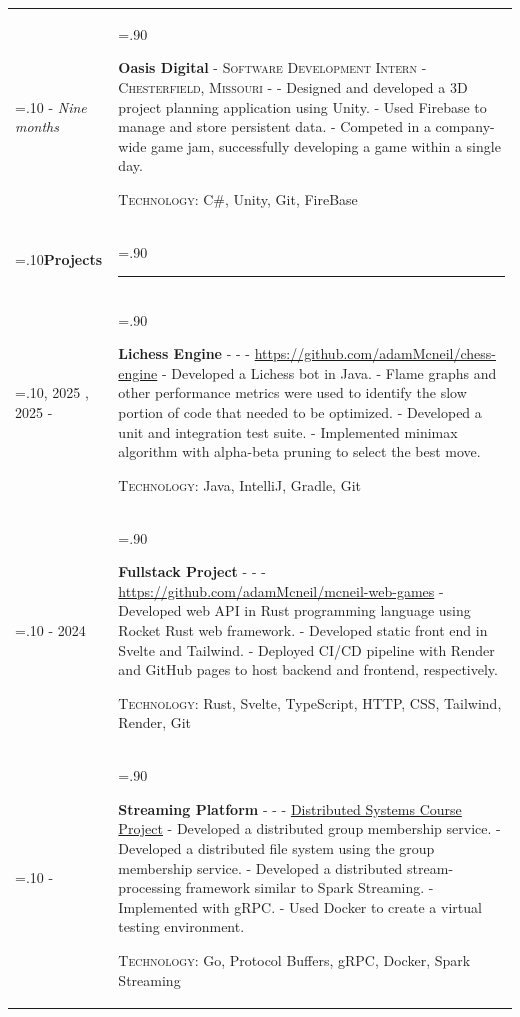 \documentclass[10pt]{article}
\newcommand{\timeFrame}[3] {
  \if\relax\detokenize{#2}\relax
    #1
  \else
    #1 - #2
  \fi
  \newline
  \scriptsize \textit{#3}
}
\newcommand{\entry}[6] {
  \textbf{#1}
  \if\relax\detokenize{#2}\relax
  \else
       - \textsc{#2}
  \fi
  \if\relax\detokenize{#3}\relax
  \else
      - \textsc{#3}
  \fi
  \if\relax\detokenize{#4}\relax
  \else
      - \href{https://#4}{#4}
  \fi
  \newline #5
  \if\relax\detokenize{#6}\relax
  \else
      \newline \textsc{Technology:} #6
  \fi
  \\
}
\newcommand{\horizontalLine}[0] {
    \noindent\rule{.90\linewidth}{0.4pt}
}
\begin{document}
\begin{tabularx}{\linewidth}{>{\hsize=.10\hsize}X>{\hsize=.90\hsize}X}
\timeFrame{2022}{}{Nine months} &
\entry{Oasis Digital}
  {Software Development Intern}
  {Chesterfield, Missouri}
  {}
  {
  - Designed and developed a 3D project planning application using Unity. \newline
  - Used Firebase to manage and store persistent data. \newline
  - Competed in a company-wide game jam, successfully developing a game within a single day.
  }
  {C\#, Unity, Git, FireBase}


\textbf{Projects} & \horizontalLine \\
\timeFrame{2021, 2025}{}{} &
\entry{Lichess Engine}
  {}
  {}
  {https://github.com/adamMcneil/chess-engine}
  {
    - Developed a Lichess bot in Java. \newline
    - Flame graphs and other performance metrics were used to identify the slow portion of code that needed to be optimized. \newline
    - Developed a unit and integration test suite. \newline
    - Implemented minimax algorithm with alpha-beta pruning to select the best move.
  }
  {Java, IntelliJ, Gradle, Git
    \newline
  }


\timeFrame{2023}{2024}{} &
\entry{Fullstack Project}
  {}
  {}
  {https://github.com/adamMcneil/mcneil-web-games}
  {
  - Developed web API in Rust programming language using Rocket Rust web framework. \newline
  - Developed static front end in Svelte and Tailwind. \newline
  - Deployed CI/CD pipeline with Render and GitHub pages to host backend and frontend, respectively.
  }
  {Rust, Svelte, TypeScript, HTTP, CSS, Tailwind, Render, Git
    \newline
  }

\timeFrame{2024}{}{} &
\entry{Streaming Platform}
  {}
  {}
  {Distributed Systems Course Project}
  {
  - Developed a distributed group membership service. \newline
  - Developed a distributed file system using the group membership service. \newline
  - Developed a distributed stream-processing framework similar to Spark Streaming. \newline
  - Implemented with gRPC. \newline
  - Used Docker to create a virtual testing environment.
  }
  {Go, Protocol Buffers, gRPC, Docker, Spark Streaming
  }



\end{tabularx}
\end{document}

